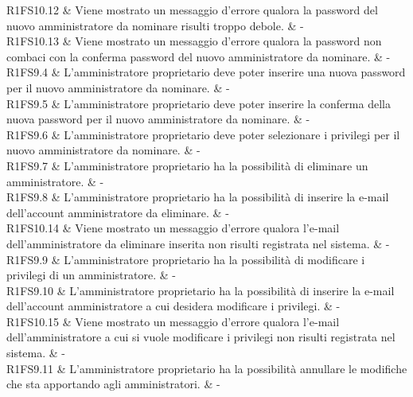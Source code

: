 R1FS10.12 & Viene mostrato un messaggio d'errore qualora la password del nuovo amministratore da nominare risulti troppo debole.  & - \\

R1FS10.13 & Viene mostrato un messaggio d'errore qualora la password non combaci con la conferma password del nuovo amministratore da nominare.  & - \\

R1FS9.4 & L'amministratore proprietario deve poter inserire una nuova password per il nuovo amministratore da nominare.  & - \\

R1FS9.5 & L'amministratore proprietario deve poter inserire la conferma della nuova password per il nuovo amministratore da nominare.  & - \\

R1FS9.6 & L'amministratore proprietario deve poter selezionare i privilegi per il nuovo amministratore da nominare.  & - \\

R1FS9.7 & L'amministratore proprietario ha la possibilità di eliminare un amministratore.  & - \\

R1FS9.8 & L'amministratore proprietario ha la possibilità di inserire la e-mail dell'account amministratore da eliminare.  & - \\

R1FS10.14 & Viene mostrato un messaggio d'errore qualora l'e-mail dell'amministratore da eliminare inserita non risulti registrata nel sistema.  & - \\

R1FS9.9 & L'amministratore proprietario ha la possibilità di modificare i privilegi di un amministratore.  & - \\

R1FS9.10 & L'amministratore proprietario ha la possibilità di inserire la e-mail dell'account amministratore a cui desidera modificare i privilegi.  & - \\

R1FS10.15 & Viene mostrato un messaggio d'errore qualora l'e-mail dell'amministratore a cui si vuole modificare i privilegi non risulti registrata nel sistema.  & - \\

R1FS9.11 & L'amministratore proprietario ha la possibilità annullare le modifiche che sta apportando agli amministratori.  & - \\
